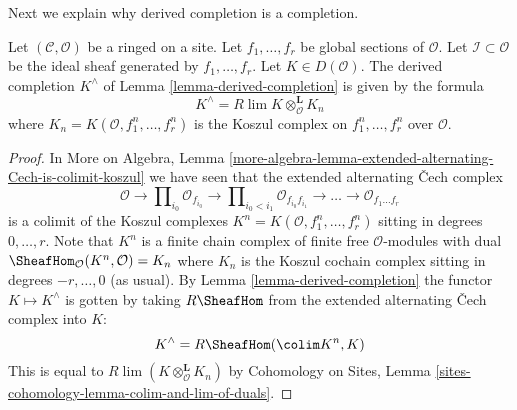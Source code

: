 \noindent
Next we explain why derived completion is a completion.

\begin{lemma}
\label{lemma-derived-completion-koszul}
Let $(\mathcal{C}, \mathcal{O})$ be a ringed on a site. Let $f_1, \ldots, f_r$
be global sections of $\mathcal{O}$. Let $\mathcal{I} \subset \mathcal{O}$ be
the ideal sheaf generated by $f_1, \ldots, f_r$. Let $K \in D(\mathcal{O})$.
The derived completion $K^\wedge$ of Lemma \ref{lemma-derived-completion}
is given by the formula
$$
K^\wedge = R\lim K \otimes^\mathbf{L}_\mathcal{O} K_n
$$
where $K_n = K(\mathcal{O}, f_1^n, \ldots, f_r^n)$
is the Koszul complex on $f_1^n, \ldots, f_r^n$ over $\mathcal{O}$.
\end{lemma}

\begin{proof}
In More on Algebra, Lemma
\ref{more-algebra-lemma-extended-alternating-Cech-is-colimit-koszul}
we have seen that the extended alternating {\v C}ech complex
$$
\mathcal{O} \to \prod\nolimits_{i_0} \mathcal{O}_{f_{i_0}} \to
\prod\nolimits_{i_0 < i_1} \mathcal{O}_{f_{i_0}f_{i_1}} \to
\ldots \to \mathcal{O}_{f_1\ldots f_r}
$$
is a colimit of the Koszul complexes
$K^n = K(\mathcal{O}, f_1^n, \ldots, f_r^n)$ sitting in
degrees $0, \ldots, r$. Note that $K^n$ is a finite chain complex
of finite free $\mathcal{O}$-modules with dual
$\SheafHom_\mathcal{O}(K^n, \mathcal{O}) = K_n$ where $K_n$ is the Koszul
cochain complex sitting in degrees $-r, \ldots, 0$ (as usual). By
Lemma \ref{lemma-derived-completion}
the functor $K \mapsto K^\wedge$ is gotten by taking
$R\SheafHom$ from the extended alternating {\v C}ech complex into $K$:
$$
K^\wedge = 
R\SheafHom(\colim K^n, K)
$$
This is equal to $R\lim (K \otimes_\mathcal{O}^\mathbf{L} K_n)$
by
Cohomology on Sites, Lemma \ref{sites-cohomology-lemma-colim-and-lim-of-duals}.
\end{proof}

